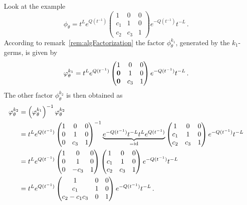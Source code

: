 Look at the example
\[
  \phi_\theta=
  t^{L}e^{Q(t^{-1})}
  \begin{pmatrix}
    1 & 0 & 0
  \\c_1 & 1 & 0
  \\c_2 & c_3 & 1
  \end{pmatrix}
  e^{-Q(t^{-1})}t^{-L} \,.
\]
According to remark~\ref{rem:algFactorization} the factor $\phi_\theta^{k_1}$,
generated by the $k_1$-germs, is given by
\[
  \phi_\theta^{k_1}=
  t^{L}e^{Q(t^{-1})}
  \begin{pmatrix}
    1 & 0 & 0
  \\\text{\boldmath $0$} & 1 & 0
  \\\text{\boldmath $0$} & c_3 & 1
  \end{pmatrix}
  e^{-Q(t^{-1})}t^{-L} \,.
\]
The other factor $\phi_\theta^{k_2}$ is then obtained as
\begin{align*}
  \phi_\theta^{k_2}&=
  \left(\phi_\theta^{k_1}\right)^{-1}
  \phi_\theta^{k_2}
\\&=t^{L}e^{Q(t^{-1})}
  \begin{pmatrix}
    1     & 0    & 0
  \\0     & 1    & 0
  \\0     & c_3 & 1
  \end{pmatrix}^{-1}
  \underset{=\id}{\underbrace{%
      e^{-Q(t^{-1})}t^{-L}
      t^{L}e^{Q(t^{-1})}
  }}
  \begin{pmatrix}
    1     & 0 & 0
  \\c_1     & 1     & 0
  \\c_2     & c_3 & 1
  \end{pmatrix}
  e^{-Q(t^{-1})}t^{-L}
\\&=t^{L}e^{Q(t^{-1})}
  \begin{pmatrix}
    1     & 0    & 0
  \\0     & 1    & 0
  \\0     & -c_3 & 1
  \end{pmatrix}
  \begin{pmatrix}
    1     & 0 & 0
  \\c_1     & 1     & 0
  \\c_2     & c_3 & 1
  \end{pmatrix}
  e^{-Q(t^{-1})}t^{-L}
\\&=t^{L}e^{Q(t^{-1})}
  \begin{pmatrix}
    1     & 0 & 0
  \\c_1     & 1          & 0
  \\c_2-c_1c_3     & 0          & 1
  \end{pmatrix}
  e^{-Q(t^{-1})}t^{-L}
  \,.
\end{align*}
